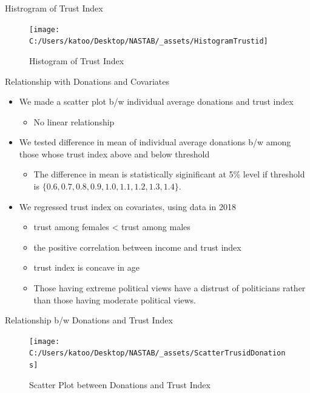 \documentclass[
  ignorenonframetext,
]{beamer}
\providecommand{\tightlist}{%
  \setlength{\itemsep}{0pt}\setlength{\parskip}{0pt}}
\begin{document}
\begin{frame}{Histrogram of Trust Index}
\protect\hypertarget{histrogram-of-trust-index}{}
\begin{figure}
\texttt{[image: C:/Users/katoo/Desktop/NASTAB/\_assets/HistogramTrustid]} \caption{Histogram of Trust Index}\label{fig:unnamed-chunk-3}
\end{figure}
\end{frame}

\begin{frame}{Relationship with Donations and Covariates}
\protect\hypertarget{relationship-with-donations-and-covariates}{}
\begin{itemize}
\tightlist
\item
  We made a scatter plot b/w individual average donations and trust index

  \begin{itemize}
  \tightlist
  \item
    No linear relationship
  \end{itemize}
\item
  We tested difference in mean of individual average donations b/w among those whose trust index above and below threshold

  \begin{itemize}
  \tightlist
  \item
    The difference in mean is statistically siginificant at 5\% level if threshold is \(\{0.6, 0.7, 0.8, 0.9, 1.0, 1.1, 1.2, 1.3, 1.4\}\).
  \end{itemize}
\item
  We regressed trust index on covariates, using data in 2018

  \begin{itemize}
  \tightlist
  \item
    trust among females \textless{} trust among males
  \item
    the positive correlation between income and trust index
  \item
    trust index is concave in age
  \item
    Those having extreme political views have a distrust of politicians rather than those having moderate political views.
  \end{itemize}
\end{itemize}
\end{frame}

\begin{frame}{Relationship b/w Donations and Trust Index}
\protect\hypertarget{relationship-bw-donations-and-trust-index}{}
\begin{figure}
\texttt{[image: C:/Users/katoo/Desktop/NASTAB/\_assets/ScatterTrusidDonations]} \caption{Scatter Plot between Donations and Trust Index}\label{fig:unnamed-chunk-4}
\end{figure}
\end{frame}
\end{document}
